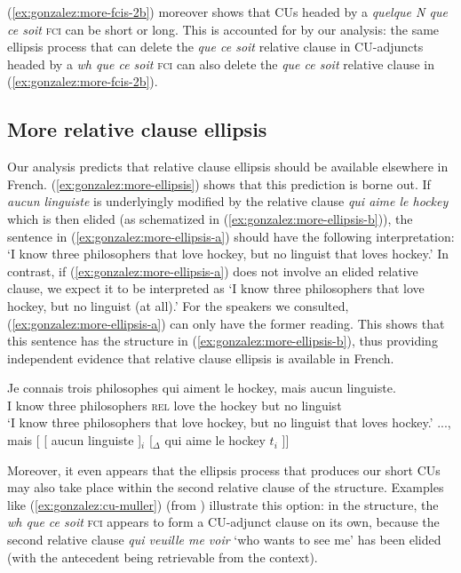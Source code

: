 \documentclass[output=paper]{langscibook}
\begin{document}
\z
 
(\ref{ex:gonzalez:more-fcis-2b}) moreover shows that CUs headed by a \emph{quelque N que ce soit} \textsc{fci} can be short or long. This is accounted for by our analysis: the same ellipsis process that can delete the \emph{que ce soit} relative clause in CU-adjuncts headed by a \emph{wh que ce soit} \textsc{fci} can also delete the \textit{que ce soit} relative clause in (\ref{ex:gonzalez:more-fcis-2b}).


\subsection{More relative clause ellipsis}

Our analysis  predicts that relative clause ellipsis should be available elsewhere in French. (\ref{ex:gonzalez:more-ellipsis}) shows that this prediction is  borne out. If \emph{aucun linguiste} is underlyingly modified by the relative clause \emph{qui aime le hockey} which is then elided (as schematized in (\ref{ex:gonzalez:more-ellipsis-b})), the sentence in (\ref{ex:gonzalez:more-ellipsis-a}) should have the following interpretation: `I know three philosophers that love hockey, but no linguist that loves hockey.' In contrast, if (\ref{ex:gonzalez:more-ellipsis-a}) does not involve an elided relative clause, we expect it to be interpreted as `I know three philosophers that love hockey, but no linguist (at all).' For the speakers we consulted,  (\ref{ex:gonzalez:more-ellipsis-a}) can only have the former reading. This shows that this sentence has the structure in (\ref{ex:gonzalez:more-ellipsis-b}), thus providing independent evidence that relative clause ellipsis is available in French.

\ea \label{ex:gonzalez:more-ellipsis}
\ea \gll Je connais trois philosophes qui aiment le hockey, mais aucun linguiste. \label{ex:gonzalez:more-ellipsis-a}\\
 I know three philosophers \textsc{rel} love the {hockey} but no linguist \\
\glt `I know three philosophers that love hockey, but no linguist that loves hockey.'
\ex ..., mais [ [ aucun linguiste ]$_i$ [$_{\Delta}$ qui aime le hockey $t_i$ ]] \label{ex:gonzalez:more-ellipsis-b}
\z 

\z

Moreover, it even appears  that the ellipsis process that produces our short CUs may also take place within the second relative clause of the structure. Examples like (\ref{ex:gonzalez:cu-muller}) (from \citealt[][13]{muller2006}) illustrate this option: in the structure, the \emph{wh que ce soit} \textsc{fci} appears to form a CU-adjunct clause on its own, because the second relative clause \emph{qui veuille me voir} `who wants to see me' has been elided (with the antecedent being retrievable from the context).
\end{document}
